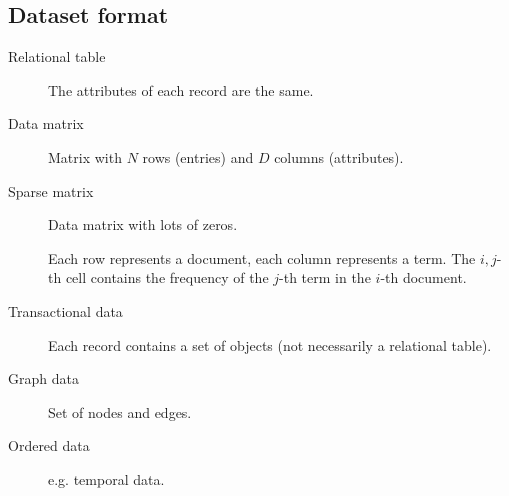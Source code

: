 \subsection{Dataset format}
\begin{description}
    \item[Relational table] 
        The attributes of each record are the same.
    
    \item[Data matrix] 
        Matrix with $N$ rows (entries) and $D$ columns (attributes).
    
    \item[Sparse matrix] 
        Data matrix with lots of zeros.
        \begin{example}
            Each row represents a document, each column represents a term.
            The $i,j$-th cell contains the frequency of the $j$-th term in the $i$-th document.
        \end{example}
    
    \item[Transactional data] 
        Each record contains a set of objects (not necessarily a relational table).
    
    \item[Graph data] 
        Set of nodes and edges.
    
    \item[Ordered data] 
        e.g. temporal data.
\end{description}


